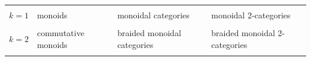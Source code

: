 \documentclass{article}
\begin{document}
\begin{longtable}[]{@{}llll@{}}
\begin{minipage}[t]{0.21\columnwidth}
\strut
\end{minipage}\tabularnewline
\begin{minipage}[t]{0.26\columnwidth}\raggedright
\(k=1\)\strut
\end{minipage} & \begin{minipage}[t]{0.21\columnwidth}\raggedright
monoids\strut
\end{minipage} & \begin{minipage}[t]{0.21\columnwidth}\raggedright
monoidal categories\strut
\end{minipage} & \begin{minipage}[t]{0.21\columnwidth}\raggedright
monoidal 2-categories\strut
\end{minipage}\tabularnewline
\begin{minipage}[t]{0.26\columnwidth}\raggedright
\strut
\end{minipage} & \begin{minipage}[t]{0.21\columnwidth}\raggedright
\strut
\end{minipage} & \begin{minipage}[t]{0.21\columnwidth}\raggedright
\strut
\end{minipage} & \begin{minipage}[t]{0.21\columnwidth}\raggedright
\strut
\end{minipage}\tabularnewline
\begin{minipage}[t]{0.26\columnwidth}\raggedright
\(k=2\)\strut
\end{minipage} & \begin{minipage}[t]{0.21\columnwidth}\raggedright
commutative monoids\strut
\end{minipage} & \begin{minipage}[t]{0.21\columnwidth}\raggedright
braided monoidal categories\strut
\end{minipage} & \begin{minipage}[t]{0.21\columnwidth}\raggedright
braided monoidal 2-categories\strut
\end{minipage}\tabularnewline
\begin{minipage}[t]{0.26\columnwidth}\raggedright
\strut
\end{minipage} & \begin{minipage}[t]{0.21\columnwidth}\raggedright
\strut
\end{minipage} & \begin{minipage}[t]{0.21\columnwidth}\raggedright
\strut
\end{minipage} & \begin{minipage}[t]{0.21\columnwidth}\raggedright

\end{minipage}
\end{longtable}
\end{document}
